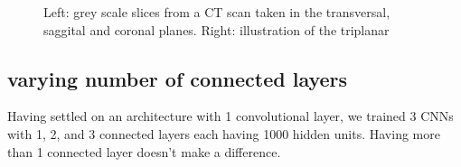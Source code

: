 \begin{figure}
\centering
\begin{minipage}{0.45\textwidth}
\centering
{}
\end{minipage}\hfill
\hspace{-1cm}
\begin{minipage}{0.45\textwidth}
\centering
{}
\end{minipage}
\caption{Left: grey scale slices from a CT scan taken in the transversal, saggital and coronal planes. Right: illustration of the triplanar}
\end{figure}

\subsection{varying number of connected layers}

Having settled on an architecture with 1 convolutional layer, we trained 3 CNNs with 1, 2, and 3 connected layers each having 1000 hidden units. Having more than 1 connected layer doesn't make a difference.

